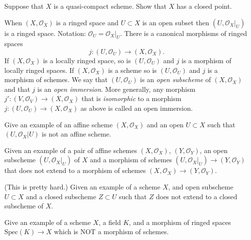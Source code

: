 \begin{exercise}
\label{exercise-quasi-compact-closed-point}
Suppose that $X$ is a quasi-compact scheme.
Show that $X$ has a closed point.
\end{exercise}

\begin{remark}
\label{remark-open-immersion}
When $(X, {\mathcal O}_X)$ is a ringed space and $U \subset X$
is an open subset then $(U, {\mathcal O}_X|_U)$ is a ringed space. Notation:
${\mathcal O}_U = {\mathcal O}_X|_U$. There is a canonical morphisms
of ringed spaces
$$
j : (U, {\mathcal O}_U) \longrightarrow (X, {\mathcal O}_X).
$$
If $(X, {\mathcal O}_X)$ is a locally ringed space, so is
$(U, {\mathcal O}_U)$ and
$j$ is a morphism of locally ringed spaces. If $(X, {\mathcal O}_X)$
is a scheme
so is $(U, {\mathcal O}_U)$ and $j$ is a morphism of schemes. We say
that
$(U, {\mathcal O}_U)$ is an {\it open subscheme} of $(X, {\mathcal O}_X)$
and that
$j$ is an {\it open immersion}. More generally, any morphism
$j' : (V, {\mathcal O}_V) \to (X, {\mathcal O}_X)$ that is {\it isomorphic}
to a
morphism $j : (U, {\mathcal O}_U) \to (X, {\mathcal O}_X)$ as above is
called an
open immersion.
\end{remark}

\begin{exercise}
\label{exercise-open-affine-not-affine}
Give an example of an affine scheme $(X, {\mathcal O}_X)$
and an open $U \subset X$ such that $(U, {\mathcal O}_X|U)$ is not an affine
scheme.
\end{exercise}

\begin{exercise}
\label{exercise-morphism-does-not-extend}
Given an example of a pair of affine schemes
$(X, {\mathcal O}_X)$, $(Y, {\mathcal O}_Y)$,
an open subscheme $(U, {\mathcal O}_X|_U)$
of $X$ and a morphism of schemes
$(U, {\mathcal O}_X|_U) \to (Y, {\mathcal O}_Y)$
that does not extend to a morphism of schemes
$(X, {\mathcal O}_X) \to (Y, {\mathcal O}_Y)$.
\end{exercise}

\begin{exercise}
\label{exercise-closed-subscheme-does-not-extend}
(This is pretty hard.)
Given an example of a scheme $X$, and open subscheme $U \subset X$
and a closed subscheme $Z \subset U$ such that $Z$ does not extend
to a closed subscheme of $X$.
\end{exercise}

\begin{exercise}
\label{exercise-not-morphism-schemes}
Give an example of a scheme $X$, a field $K$, and a
morphism of ringed spaces $\text{Spec}(K) \to X$ which
is NOT a morphism of schemes.
\end{exercise}

